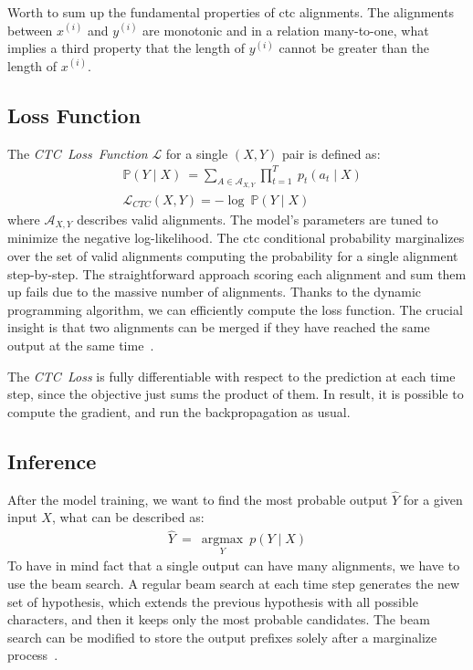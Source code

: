 Worth to sum up the fundamental properties of \acrshort{ctc} alignments.
The alignments between $x^{(i)}$ and $y^{(i)}$ are monotonic and in a relation many-to-one, what
implies a third property that the length of $y^{(i)}$ cannot be greater than the length of $x^{(i)}$.


\subsection{Loss Function}\label{subsec:loss-function}

The \textit{CTC~Loss~Function} $\mathcal{L}$ for a single $(X, Y)$ pair is defined as:
\begin{align}
& \mathbb{P}(Y \mid X) \ = \sum_{A \in \mathcal{A}_{X,Y}} \prod_{t=1}^T \ p_t(a_t \mid X)      \\[5pt]
& \mathcal{L}_{CTC}(X, Y) = -\log \ \mathbb{P}(Y \mid X)
\end{align}
where $\mathcal{A}_{X,Y}$ describes valid alignments.
The model's parameters are tuned to minimize the negative log-likelihood.
The \acrshort{ctc} conditional probability marginalizes over the set of valid alignments
computing the probability for a single alignment step-by-step.
The straightforward approach scoring each alignment and sum them up fails due to
the massive number of alignments.
Thanks to the dynamic programming algorithm, we can efficiently compute the loss function.
The crucial insight is that two alignments can be merged if they have reached the same
output at the same time~\cite{hannun2017}.

The \textit{CTC~Loss} is fully differentiable with respect to the prediction at each time step,
since the objective just sums the product of them.
In result, it is possible to compute the gradient, and run the backpropagation as usual.


\subsection{Inference}\label{subsec:inference}

After the model training, we want to find the most probable output $\hat{Y}$ for a given input $X$,
what can be described as:
\begin{align}
  \hat{Y} \ = \ \underset{Y}{\operatorname{argmax}} \ p(Y \mid X)
\end{align}
To have in mind fact that a single output can have many alignments,
we have to use the beam search.
A regular beam search at each time step generates the new set of hypothesis, which
extends the previous hypothesis with all possible characters, and
then it keeps only the most probable candidates.
The beam search can be modified to store the output prefixes solely
after a marginalize process~\cite{hannun2017}.
